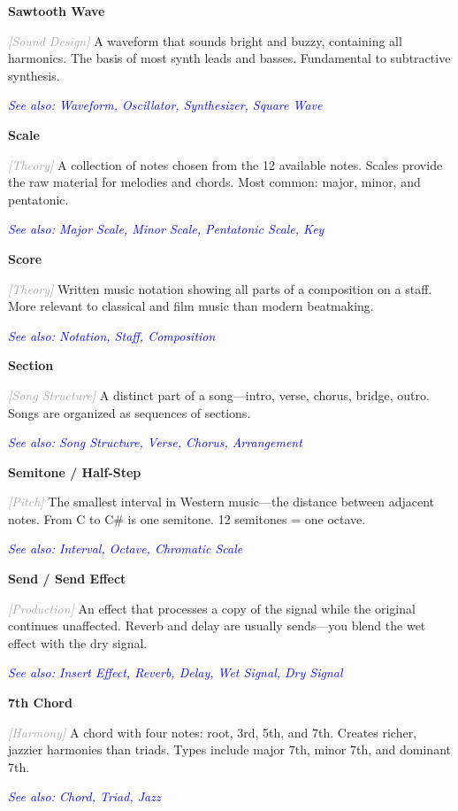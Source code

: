 \documentclass[11pt,letterpaper]{article}
\newcommand{\term}[1]{\textbf{\large\color{purple}#1}}
\newcommand{\category}[1]{\textcolor{darkgray}{\textit{\small [#1]}}}
\newcommand{\seealso}[1]{\textcolor{blue}{\textit{See also: #1}}}
\newenvironment{termdef}[1]
  {\noindent\term{#1}\par\nopagebreak}
  {\par\vspace{0.3em}}
\begin{document}
\begin{termdef}{Sawtooth Wave}
\category{Sound Design}
A waveform that sounds bright and buzzy, containing all harmonics. The basis of most synth leads and basses. Fundamental to subtractive synthesis.

\seealso{Waveform, Oscillator, Synthesizer, Square Wave}
\end{termdef}

\begin{termdef}{Scale}
\category{Theory}
A collection of notes chosen from the 12 available notes. Scales provide the raw material for melodies and chords. Most common: major, minor, and pentatonic.

\seealso{Major Scale, Minor Scale, Pentatonic Scale, Key}
\end{termdef}

\begin{termdef}{Score}
\category{Theory}
Written music notation showing all parts of a composition on a staff. More relevant to classical and film music than modern beatmaking.

\seealso{Notation, Staff, Composition}
\end{termdef}

\begin{termdef}{Section}
\category{Song Structure}
A distinct part of a song—intro, verse, chorus, bridge, outro. Songs are organized as sequences of sections.

\seealso{Song Structure, Verse, Chorus, Arrangement}
\end{termdef}

\begin{termdef}{Semitone / Half-Step}
\category{Pitch}
The smallest interval in Western music—the distance between adjacent notes. From C to C\# is one semitone. 12 semitones = one octave.

\seealso{Interval, Octave, Chromatic Scale}
\end{termdef}

\begin{termdef}{Send / Send Effect}
\category{Production}
An effect that processes a copy of the signal while the original continues unaffected. Reverb and delay are usually sends—you blend the wet effect with the dry signal.

\seealso{Insert Effect, Reverb, Delay, Wet Signal, Dry Signal}
\end{termdef}

\begin{termdef}{7th Chord}
\category{Harmony}
A chord with four notes: root, 3rd, 5th, and 7th. Creates richer, jazzier harmonies than triads. Types include major 7th, minor 7th, and dominant 7th.

\seealso{Chord, Triad, Jazz}
\end{termdef}
\end{document}
